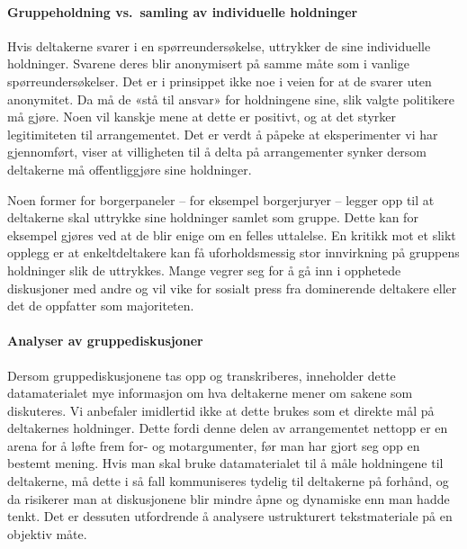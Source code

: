 \documentclass[
  12pt,
  a4paper, 12pt]{article}
\begin{document}
\hypertarget{gruppeholdning-vs.-samling-av-individuelle-holdninger}{%
\paragraph{Gruppeholdning vs.~samling av individuelle holdninger}\label{gruppeholdning-vs.-samling-av-individuelle-holdninger}}

Hvis deltakerne svarer i en spørreundersøkelse, uttrykker de sine individuelle holdninger. Svarene deres blir anonymisert på samme måte som i vanlige spørreundersøkelser. Det er i prinsippet ikke noe i veien for at de svarer uten anonymitet. Da må de «stå til ansvar» for holdningene sine, slik valgte politikere må gjøre. Noen vil kanskje mene at dette er positivt, og at det styrker legitimiteten til arrangementet. Det er verdt å påpeke at eksperimenter vi har gjennomført, viser at villigheten til å delta på arrangementer synker dersom deltakerne må offentliggjøre sine holdninger.

Noen former for borgerpaneler -- for eksempel borgerjuryer -- legger opp til at deltakerne skal uttrykke sine holdninger samlet som gruppe. Dette kan for eksempel gjøres ved at de blir enige om en felles uttalelse. En kritikk mot et slikt opplegg er at enkeltdeltakere kan få uforholdsmessig stor innvirkning på gruppens holdninger slik de uttrykkes. Mange vegrer seg for å gå inn i opphetede diskusjoner med andre og vil vike for sosialt press fra dominerende deltakere eller det de oppfatter som majoriteten.

\hypertarget{analyser-av-gruppediskusjoner}{%
\paragraph{Analyser av gruppediskusjoner}\label{analyser-av-gruppediskusjoner}}

Dersom gruppediskusjonene tas opp og transkriberes, inneholder dette datamaterialet mye informasjon om hva deltakerne mener om sakene som diskuteres. Vi anbefaler imidlertid ikke at dette brukes som et direkte mål på deltakernes holdninger. Dette fordi denne delen av arrangementet nettopp er en arena for å løfte frem for- og motargumenter, før man har gjort seg opp en bestemt mening. Hvis man skal bruke datamaterialet til å måle holdningene til deltakerne, må dette i så fall kommuniseres tydelig til deltakerne på forhånd, og da risikerer man at diskusjonene blir mindre åpne og dynamiske enn man hadde tenkt. Det er dessuten utfordrende å analysere ustrukturert tekstmateriale på en objektiv måte.
\end{document}
